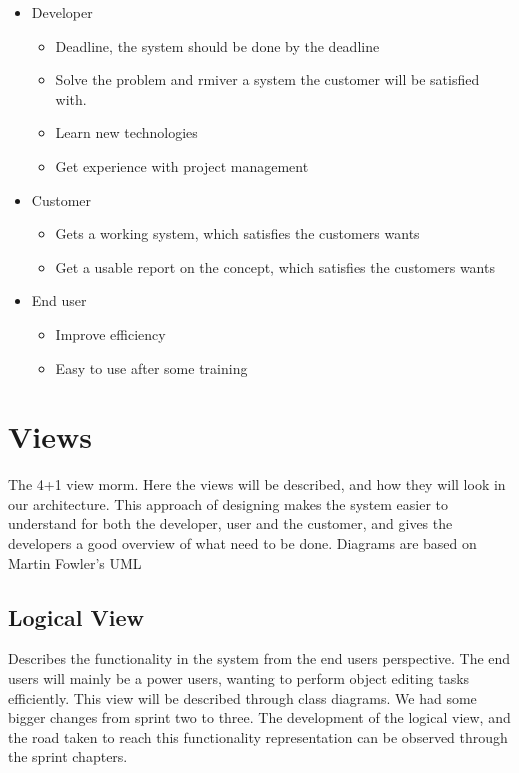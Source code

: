 \begin{itemize}
    \item Developer
    \begin{itemize}
        \item Deadline, the system should be done by the deadline
        \item Solve the problem and rmiver a system the customer will be satisfied with.
        \item Learn new technologies
        \item Get experience with project management
        \end{itemize}
    \item Customer
    \begin{itemize}
        \item Gets a working system, which satisfies the customers wants
        \item Get a usable report on the concept, which satisfies the customers wants
    \end{itemize}
    \item End user
    \begin{itemize}
        \item Improve efficiency
        \item Easy to use after some training
    \end{itemize}
\end{itemize}



\section{Views} \label{Views}
The 4+1 view morm\cite{Kruchten}. Here the views will be described, and how they will look in our architecture. This approach of designing makes the system easier to understand for both the developer, user and the customer, and gives the developers a good overview of what need to be done. Diagrams are based on Martin Fowler's UML\cite{Fowl04}

\subsection{Logical View}
Describes the functionality in the system from the end users perspective. The end users will mainly be a power users, wanting to perform object editing tasks efficiently. This view will be described through class diagrams.  We had some bigger changes from sprint two to three. The development of the logical view, and the road taken to reach this functionality representation can be observed through the sprint chapters.

